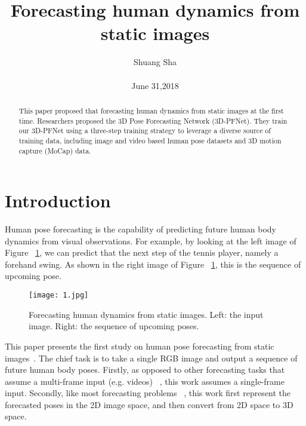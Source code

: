 \documentclass[10pt,twocolumn,letterpaper]{article}
\begin{document}
\title{Forecasting human dynamics from static images}

\author{Shuang Sha \\\\ June 31,2018}

\maketitle

\begin{abstract}
  This paper proposed that forecasting human dynamics from static images at the first time. Researchers proposed the 3D Pose Forecasting Network (3D-PFNet). They train our 3D-PFNet using a three-step training strategy to leverage a diverse source of training data, including image and video based human pose datasets and 3D motion capture (MoCap) data.
\end{abstract}

\section{Introduction}

Human pose forecasting is the capability of predicting future human body dynamics from visual observations. For example, by looking at the left image of Figure ~\ref{fig:onecol}, we can predict that the next step of the tennis player, namely a forehand swing. As shown in the right image of Figure ~\ref{fig:onecol}, this is the sequence of upcoming pose.

\begin{figure}[!htb]
\begin{center}
   \texttt{[image: 1.jpg]}
\end{center}
   \caption{Forecasting human dynamics from static images. Left:
the input image. Right: the sequence of upcoming poses.}
\label{fig:onecol}
\end{figure}

This paper presents the first study on human pose forecasting from static images~\cite{chao2017forecasting}. The chief task is to take a single RGB image and output a sequence of future human body poses. Firstly, as opposed to other forecasting tasks that assume a multi-frame input (e.g. videos) ~\cite{srivastava2015unsupervised}, this work assumes a single-frame input. Secondly, like most forecasting problems ~\cite{yuen2010data}, this work first represent the forecasted poses in the 2D image space, and then convert from 2D space to 3D space.
\end{document}
